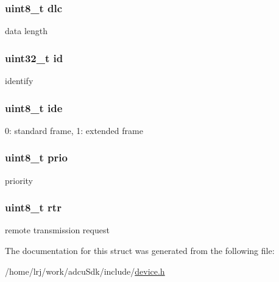 \subsubsection[{\texorpdfstring{dlc}{dlc}}]{\setlength{\rightskip}{0pt plus 5cm}uint8\+\_\+t dlc}\hypertarget{structp__adcuCanData_a19defed5d87587252d55e15cf3d5432d}{}\label{structp__adcuCanData_a19defed5d87587252d55e15cf3d5432d}
data length 
\subsubsection[{\texorpdfstring{id}{id}}]{\setlength{\rightskip}{0pt plus 5cm}uint32\+\_\+t id}\hypertarget{structp__adcuCanData_abaabdc509cdaba7df9f56c6c76f3ae19}{}\label{structp__adcuCanData_abaabdc509cdaba7df9f56c6c76f3ae19}
identify 
\subsubsection[{\texorpdfstring{ide}{ide}}]{\setlength{\rightskip}{0pt plus 5cm}uint8\+\_\+t ide}\hypertarget{structp__adcuCanData_aa9dce2f3e5db51ea2a5d0ea09bab7e66}{}\label{structp__adcuCanData_aa9dce2f3e5db51ea2a5d0ea09bab7e66}
0\+: standard frame, 1\+: extended frame 
\subsubsection[{\texorpdfstring{prio}{prio}}]{\setlength{\rightskip}{0pt plus 5cm}uint8\+\_\+t prio}\hypertarget{structp__adcuCanData_acc0b27a6740f03639727be452f1e6b83}{}\label{structp__adcuCanData_acc0b27a6740f03639727be452f1e6b83}
priority 
\subsubsection[{\texorpdfstring{rtr}{rtr}}]{\setlength{\rightskip}{0pt plus 5cm}uint8\+\_\+t rtr}\hypertarget{structp__adcuCanData_a7be9c2d0472674ddfd4e8c1ce2e460c4}{}\label{structp__adcuCanData_a7be9c2d0472674ddfd4e8c1ce2e460c4}
remote transmission request 

The documentation for this struct was generated from the following file\+:\begin{DoxyCompactItemize}
\item 
/home/lrj/work/adcu\+Sdk/include/\hyperlink{device_8h}{device.\+h}\end{DoxyCompactItemize}
